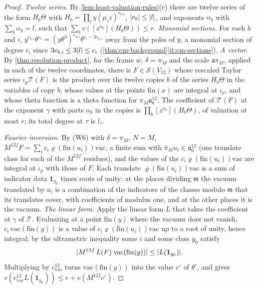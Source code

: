 \begin{proof}
\emph{Twelve series.} By \cref{lem:least-valuation-rules}(c) there are twelve series of the form $H_b\Theta$ with $H_b=\prod_iy(\mu_iz)^{e_{b,i}}$, $\lvert e_b\rvert\le\lvert l\rvert$, and exponents $\alpha_b$ with $\sum_b\alpha_b=l$, such that $\sum_bv([z^{\alpha_b}](H_b\Theta))\le r$. \emph{Monomial sections.} For each $b$ and $i$, $y^{e_{b,i}}\theta^{c_i}=(y\theta^3)^{e_{b,i}}\theta^{c_i-3e_{b,i}}$ away from the poles of $y$, a monomial section of degree $c_i$ since $3e_{b,i}\le3\lvert l\rvert\le c_i$ (\cref{thm:cm-background}\ref{it:cm-sections}). \emph{A vector.} By \cref{thm:resolution-product}, for the frame $w$, $\delta=\pi_M$ and the scale $\mathsf a\pi_M$, applied in each of the twelve coordinates, there is $F\in\mathcal S(V_{12})$ whose rescaled Taylor series $\iota_p\mathcal T(F)$ is the product over the twelve copies $b$ of the series $H_b\Theta$ in the variables of copy $b$, whose values at the points $\mathrm{fin}(x)$ are integral at $\iota_p$, and whose theta function is a theta function for $\pi_M\mathfrak a_0^{12}$. The coefficient of $\mathcal T(F)$ at the exponent $\gamma$ with parts $\alpha_b$ in the copies is $\prod_b[z^{\alpha_b}](H_b\Theta)$, of valuation at most $r$; its total degree at $\tau$ is $l_\tau$.

\emph{Fourier inversion.} By (W6) with $\delta=\pi_M$, $N=M$, $M^{12f}F=\sum_ic_i\varrho(\mathrm{fin}(u_i))\mathrm{vac}$, a finite sum with $\bar\pi_Mu_i\in\mathfrak a_0^{12}$ (one translate class for each of the $M^{12f}$ residues), and the values of the $c_i\varrho(\mathrm{fin}(u_i))\mathrm{vac}$ are integral at $\iota_p$ with those of $F$. Each translate $\varrho(\mathrm{fin}(u_i))\mathrm{vac}$ is a sum of indicator data $\mathbf1_{y_0}$ times roots of unity: at the places dividing $\mathfrak m$ the vacuum translated by $u_i$ is a combination of the indicators of the classes modulo $\mathfrak m$ that its translates cover, with coefficients of modulus one, and at the other places it is the vacuum. \emph{The linear form.} Apply the linear form $L$ that takes the coefficient at $\gamma$ of $\mathcal T$. Evaluating at a point $\mathrm{fin}(y)$ where the vacuum does not vanish, $c_i\,\mathrm{vac}(\mathrm{fin}(y))$ is a value of $c_i\varrho(\mathrm{fin}(u_i))\mathrm{vac}$ up to a root of unity, hence integral; by the ultrametric inequality some $i$ and some class $y_0$ satisfy
\[
  \lvert M^{12f}\,L(F)\;\mathrm{vac}(\mathrm{fin}(y))\rvert\le\lvert L(\mathbf1_{y_0})\rvert.
\]
Multiplying by $c_{\mathrm{vac}}^{12}$ turns $\mathrm{vac}(\mathrm{fin}(y))$ into the value $c^\circ$ of $\theta^\circ$, and gives $v(c_{\mathrm{vac}}^{12}L(\mathbf1_{y_0}))\le r+v(M^{12f}c^\circ)$.
\end{proof}

